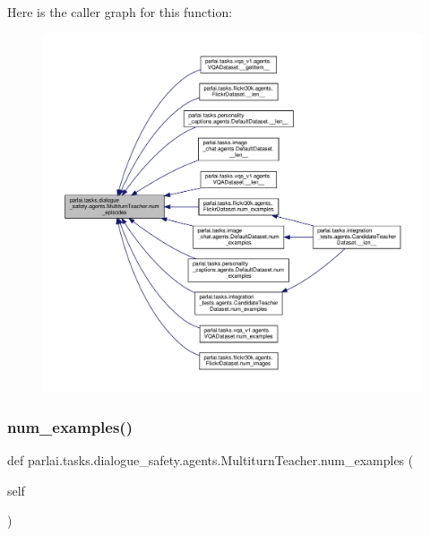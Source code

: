 Here is the caller graph for this function\+:
\nopagebreak
\begin{figure}[H]
\begin{center}
\leavevmode
\includegraphics[width=350pt]{classparlai_1_1tasks_1_1dialogue__safety_1_1agents_1_1MultiturnTeacher_a575c593a682c770a7c13f98fc7a3ce79_icgraph}
\end{center}
\end{figure}
\mbox{\label{classparlai_1_1tasks_1_1dialogue__safety_1_1agents_1_1MultiturnTeacher_ac6e4dcbf81c1576d9415ed579a68a4f7}} 
\subsubsection{\texorpdfstring{num\+\_\+examples()}{num\_examples()}}
{\footnotesize\ttfamily def parlai.\+tasks.\+dialogue\+\_\+safety.\+agents.\+Multiturn\+Teacher.\+num\+\_\+examples (\begin{DoxyParamCaption}\item[{}]{self }\end{DoxyParamCaption})}



